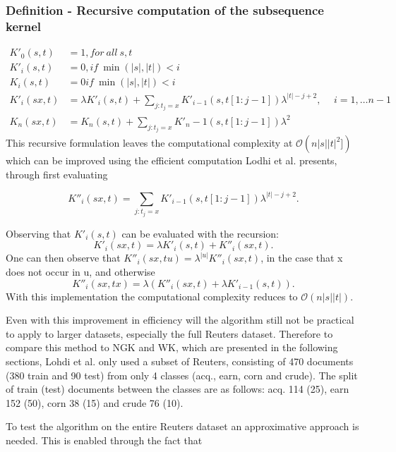 \subsubsection*{Definition - Recursive computation of the subsequence kernel}
\begin{align*}
	K'_{0}(s,t) & = 1, for\ all\ s,t \\
	K'_i(s,t) & = 0, if\ \min(|s|,|t|) < i \\
	K_i(s,t) & = 0 if\ \min(|s|,|t|) < i \\
	K'_i(sx,t) & = \lambda K'_i(s,t) + \sum_{j:t_j=x} K'_{i-1}(s,t[1:j-1])\lambda^{|t|-j+2}, \hspace{15pt} i = 1, \dots n-1 \\	
	K_{n}(sx,t) & = K_n(s,t) + \sum_{j:t_j = x}K'_n-1(s,t[1:j-1])\lambda^2
\end{align*}  
This recursive formulation leaves the computational complexity at $ \mathcal{O}(n|s||t|^2]) $ which can be improved using the efficient computation Lodhi et al. presents, through first evaluating

\begin{equation*}\label{key}
K''_i(sx,t) = \sum_{j:t_j = x}K'_{i-1}(s,t[1:j-1])\lambda^{|t|-j+2}.
\end{equation*}

Observing that $ K'_i(s,t) $ can be evaluated with the recursion:
\begin{equation*}\label{key}
K'_i(sx,t) = \lambda K'_i(s,t) + K''_i(sx,t).
\end{equation*}
One can then observe that $ K''_i(sx,tu) = \lambda^{|u|}K''_i(sx,t)$, in the case that x does not occur in u, and otherwise 
\begin{equation*}\label{key}
K''_i(sx,tx) = \lambda \left( K''_i(sx,t) + \lambda K'_{i-1}(s,t) \right).
\end{equation*} 
With this implementation the computational complexity reduces to $ \mathcal{O}(n|s||t|) $.

Even with this improvement in efficiency will the algorithm still not be practical to apply to larger datasets, especially the full Reuters dataset. Therefore to compare this method to NGK and WK, which are presented in the following sections, Lohdi et al. only used a subset of Reuters, consisting of 470 documents (380 train and 90 test)  from only 4 classes (acq., earn, corn and crude). The split of train (test) documents between the classes are as follows: acq. 114 (25), earn 152 (50), corn 38 (15) and crude 76 (10).

To test the algorithm on the entire Reuters dataset an approximative approach is needed. This is enabled through the fact that 

